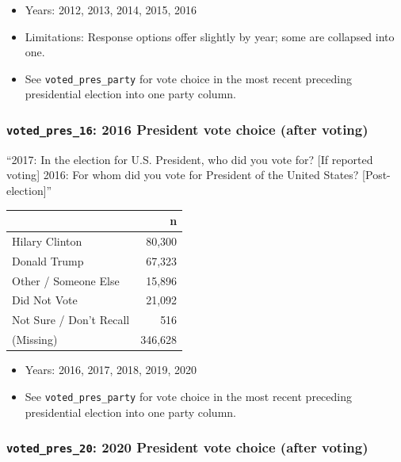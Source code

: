 \documentclass[10pt,article,oneside]{memoir}
\theoremstyle{definition}
\begin{document}
\begin{itemize}
\tightlist
\item
  Years: 2012, 2013, 2014, 2015, 2016
\item
  Limitations: Response options offer slightly by year; some are
  collapsed into one.
\item
  See \texttt{voted\_pres\_party} for vote choice in the most recent
  preceding presidential election into one party column.
\end{itemize}

\hypertarget{voted_pres_16-2016-president-vote-choice-after-voting}{%
\subsubsection{\texorpdfstring{\texttt{voted\_pres\_16}: 2016 President
vote choice (after
voting)}{voted\_pres\_16: 2016 President vote choice (after voting)}}\label{voted_pres_16-2016-president-vote-choice-after-voting}}

``2017: In the election for U.S. President, who did you vote for? {[}If
reported voting{]} 2016: For whom did you vote for President of the
United States? {[}Post-election{]}''

\begin{table}[H]
\centering
\begin{tabular}{lr}
\toprule
 & n\\
\midrule
Hilary Clinton & 80,300\\
Donald Trump & 67,323\\
Other / Someone Else & 15,896\\
Did Not Vote & 21,092\\
Not Sure / Don't Recall & 516\\
(Missing) & 346,628\\
\bottomrule
\end{tabular}
\end{table}

\begin{itemize}
\tightlist
\item
  Years: 2016, 2017, 2018, 2019, 2020
\item
  See \texttt{voted\_pres\_party} for vote choice in the most recent
  preceding presidential election into one party column.
\end{itemize}

\hypertarget{voted_pres_20-2020-president-vote-choice-after-voting}{%
\subsubsection{\texorpdfstring{\texttt{voted\_pres\_20}: 2020 President
vote choice (after
voting)}{voted\_pres\_20: 2020 President vote choice (after voting)}}\label{voted_pres_20-2020-president-vote-choice-after-voting}}
\end{document}
